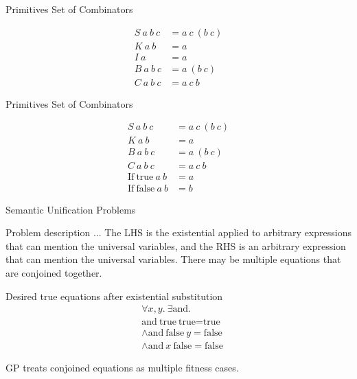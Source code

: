 \documentclass[mathserif]{beamer}
\newcommand{\n}[1]{\textrm{#1}}
\begin{document}
\begin{frame}{Primitives Set of Combinators}

\begin{align*}
S ~ a ~ b ~ c &= a ~ c ~ (b ~ c)\\
K ~ a ~ b &= a\\
I ~ a &= a\\
B ~ a ~ b ~ c &= a ~ (b ~ c)\\
C ~ a ~ b ~ c &= a ~ c ~ b
\end{align*}

\end{frame}


\begin{frame}{Primitives Set of Combinators}

\begin{align*}
S ~ a ~ b ~ c &= a ~ c ~ (b ~ c)\\
K ~ a ~ b &= a\\
B ~ a ~ b ~ c &= a ~ (b ~ c)\\
C ~ a ~ b ~ c &= a ~ c ~ b\\
\n{If} ~ \n{true} ~ a ~ b &= a\\
\n{If} ~ \n{false} ~ a ~ b &= b
\end{align*}

\end{frame}

\begin{frame}{Semantic Unification Problems}

\begin{block}{Problem description}
... The LHS is the existential
applied to arbitrary expressions that can mention the universal
variables, and the RHS is an arbitrary
expression that can mention the universal variables. There may be
multiple equations that are conjoined together.
\end{block}

\begin{block}{Desired true equations after existential substitution}
\begin{align*}
&\forall x,y . ~ \exists \n{and} .\\
&\n{and} ~ \n{true} ~ \n{true} = \n{true}\\
&\land \n{and} ~ \n{false} ~ y = \n{false}\\
&\land \n{and} ~ x ~ \n{false} = \n{false}
\end{align*}
\end{block}

GP treats conjoined equations as multiple fitness cases.

\end{frame}
\end{document}
